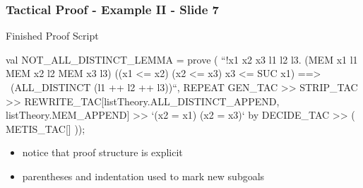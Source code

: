\begin{frame}[fragile]
\frametitle{Tactical Proof - Example II - Slide 7}

\begin{block}{Finished Proof Script}
\begin{semiverbatim}\scriptsize
val NOT_ALL_DISTINCT_LEMMA = prove (
``!x1 x2 x3 l1 l2 l3.
  (MEM x1 l1 \holAnd{} MEM x2 l2 \holAnd{} MEM x3 l3) \holAnd{}
  ((x1 <= x2) \holAnd{} (x2 <= x3) \holAnd{} x3 <= SUC x1) ==>
  ~(ALL_DISTINCT (l1 ++ l2 ++ l3))``,
REPEAT GEN\_TAC >> STRIP\_TAC >>
REWRITE\_TAC[listTheory.ALL_DISTINCT\_APPEND, listTheory.MEM\_APPEND] >>
`(x2 = x1) \holOr{} (x2 = x3)` by DECIDE_TAC >> (
  METIS\_TAC[]
));
\end{semiverbatim}
\end{block}
\begin{itemize}
\item notice that proof structure is explicit
\item parentheses and indentation used to mark new subgoals
\end{itemize}
\end{frame}



